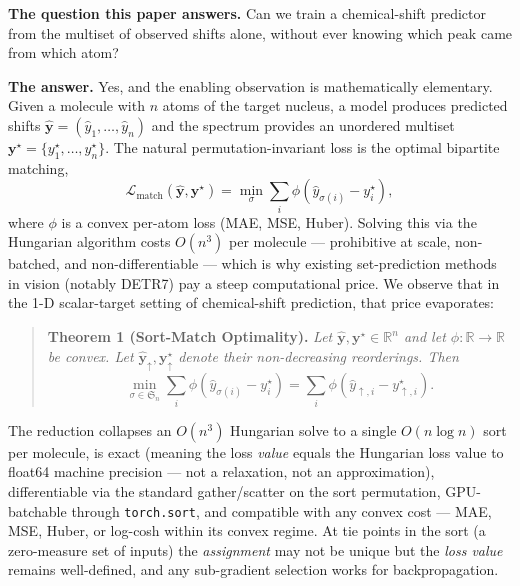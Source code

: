 \documentclass[
]{article}
\begin{document}
\textbf{The question this paper answers.} Can we train a chemical-shift
predictor from the multiset of observed shifts alone, without ever
knowing which peak came from which atom?

\textbf{The answer.} Yes, and the enabling observation is mathematically
elementary. Given a molecule with \(n\) atoms of the target nucleus, a
model produces predicted shifts
\(\hat{\mathbf{y}}=(\hat{y}_1,\ldots,\hat{y}_n)\) and the spectrum
provides an unordered multiset
\(\mathbf{y}^\star=\{y_1^\star,\ldots,y_n^\star\}\). The natural
permutation-invariant loss is the optimal bipartite matching,
\[\mathcal{L}_{\text{match}}(\hat{\mathbf{y}},\mathbf{y}^\star)=\min_\sigma \sum_i \phi\!\left(\hat{y}_{\sigma(i)}-y_i^\star\right),\]
where \(\phi\) is a convex per-atom loss (MAE, MSE, Huber). Solving this
via the Hungarian algorithm costs \(O(n^3)\) per molecule ---
prohibitive at scale, non-batched, and non-differentiable --- which is
why existing set-prediction methods in vision (notably DETR7) pay a
steep computational price. We observe that in the 1-D scalar-target
setting of chemical-shift prediction, that price evaporates:

\begin{quote}
\textbf{Theorem 1 (Sort-Match Optimality).} \emph{Let
\(\hat{\mathbf{y}},\mathbf{y}^\star\in\mathbb{R}^n\) and let
\(\phi:\mathbb{R}\to\mathbb{R}\) be convex. Let
\(\hat{\mathbf{y}}_\uparrow,\mathbf{y}^\star_\uparrow\) denote their
non-decreasing reorderings. Then}
\[\min_{\sigma\in\mathfrak{S}_n}\sum_i \phi\!\left(\hat{y}_{\sigma(i)}-y_i^\star\right)=\sum_i \phi\!\left(\hat{y}_{\uparrow,i}-y^\star_{\uparrow,i}\right).\]
\end{quote}

The reduction collapses an \(O(n^3)\) Hungarian solve to a single
\(O(n\log n)\) sort per molecule, is exact (meaning the loss
\emph{value} equals the Hungarian loss value to float64 machine
precision --- not a relaxation, not an approximation), differentiable
via the standard gather/scatter on the sort permutation, GPU-batchable
through \texttt{torch.sort}, and compatible with any convex cost ---
MAE, MSE, Huber, or log-cosh within its convex regime. At tie points in
the sort (a zero-measure set of inputs) the \emph{assignment} may not be
unique but the \emph{loss value} remains well-defined, and any
sub-gradient selection works for backpropagation.
\end{document}
